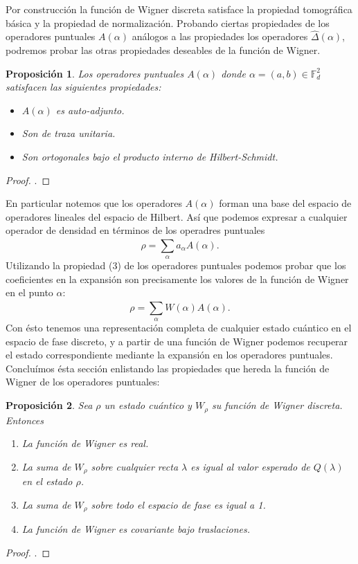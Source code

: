 \documentclass[a4paper]{report}
\newtheorem{proposition}{Proposición}
\begin{document}
  Por construcción la función de Wigner discreta
  satisface la propiedad tomográfica básica y la propiedad
  de normalización. Probando ciertas propiedades de los
  operadores puntuales $A(\alpha)$ análogos a las
  propiedades los operadores $\hat \Delta(\alpha)$, podremos
  probar las otras propiedades deseables de la función de
  Wigner.
  \begin{proposition}
    Los operadores puntuales $A(\alpha)$ donde $\alpha =
    (a,b) \in \mathbb F_d^2$ satisfacen las siguientes
    propiedades:
    \begin{itemize}
      \item $A(\alpha)$ es auto-adjunto.
      \item Son de traza unitaria.
      \item Son ortogonales bajo el producto interno de
        Hilbert-Schmidt.
    \end{itemize}
  \end{proposition}
  \begin{proof}
    .
  \end{proof}

  En particular notemos que los operadores $A(\alpha)$ 
  forman una base del espacio de operadores lineales del
  espacio de Hilbert. Así que podemos expresar a cualquier
  operador de densidad en términos de los operadres
  puntuales
  \[
    \rho = \sum_{\alpha}^{} a_\alpha A(\alpha).
  \] 
  Utilizando la propiedad (3) de los operadores puntuales
  podemos probar que los coeficientes en la expansión son
  precisamente los valores de la función de Wigner en el
  punto $\alpha$:
  \[
    \rho = \sum_{\alpha}^{} W(\alpha) A(\alpha).
  \] 
  Con ésto tenemos una representación completa de cualquier
  estado cuántico en el espacio de fase discreto, y a partir
  de una función de Wigner podemos recuperar el estado
  correspondiente mediante la expansión en los operadores
  puntuales. Concluímos ésta sección enlistando las
  propiedades que hereda la función de Wigner de los
  operadores puntuales:
  \begin{proposition}
    Sea $\rho$ un estado cuántico y $W_\rho$ su función de
    Wigner discreta. Entonces
    \begin{enumerate}
      \item La función de Wigner es real.
      \item La suma de $W_\rho$ sobre cualquier recta
        $\lambda$ es igual al valor esperado de $Q(\lambda)$ 
        en el estado $\rho$.
      \item La suma de $W_\rho$ sobre todo el espacio de fase
        es igual a 1.
      \item La función de Wigner es covariante bajo
        traslaciones.
    \end{enumerate}
  \end{proposition}
  \begin{proof}
    .
  \end{proof}
\end{document}
